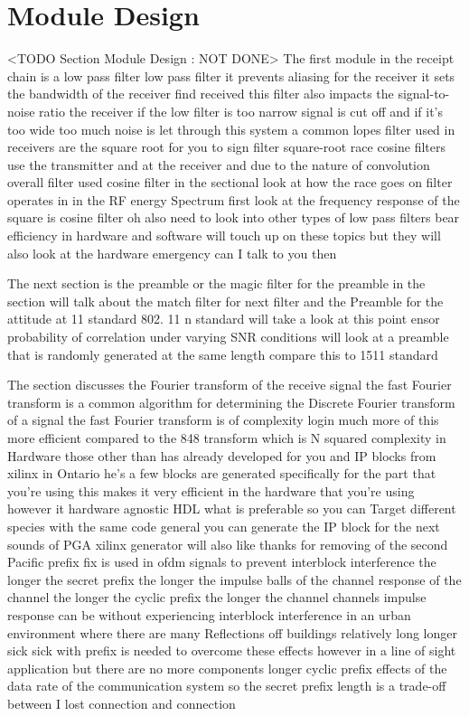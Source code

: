 \section{Module Design}
	<TODO Section Module Design : NOT DONE>
The first module in the receipt chain is a low pass filter low pass filter it prevents aliasing for the receiver it sets the bandwidth of the receiver find received this filter also impacts the signal-to-noise ratio the receiver if the low filter is too narrow signal is cut off and if it's too wide too much noise is let through this system a common lopes filter used in receivers are the square root for you to sign filter square-root race cosine filters use the transmitter and at the receiver and due to the nature of convolution overall filter used cosine filter in the sectional look at how the race goes on filter operates in in the RF energy Spectrum first look at the frequency response of the square is cosine filter oh also need to look into other types of low pass filters bear efficiency in hardware and software will touch up on these topics but they will also look at the hardware emergency can I talk to you then

The next section is the preamble or the magic filter for the preamble in the section will talk about the match filter for next filter and the Preamble for the attitude at 11 standard 802. 11 n standard will take a look at this point ensor probability of correlation under varying SNR conditions will look at a preamble that is randomly generated at the same length compare this to 1511 standard

The section discusses the Fourier transform of the receive signal the fast Fourier transform is a common algorithm for determining the Discrete Fourier transform of a signal the fast Fourier transform is of complexity login much more of this more efficient compared to the 848 transform which is N squared complexity in Hardware those other than has already developed for you and IP blocks from xilinx in Ontario he's a few blocks are generated specifically for the part that you're using this makes it very efficient in the hardware that you're using however it hardware agnostic HDL what is preferable so you can Target different species with the same code general you can generate the IP block for the next sounds of PGA xilinx generator will also like thanks for removing of the second Pacific prefix fix is used in ofdm signals to prevent interblock interference the longer the secret prefix the longer the impulse balls of the channel response of the channel the longer the cyclic prefix the longer the channel channels impulse response can be without experiencing interblock interference in an urban environment where there are many Reflections off buildings relatively long longer sick sick with prefix is needed to overcome these effects however in a line of sight application but there are no more components longer cyclic prefix effects of the data rate of the communication system so the secret prefix length is a trade-off between I lost connection and connection

